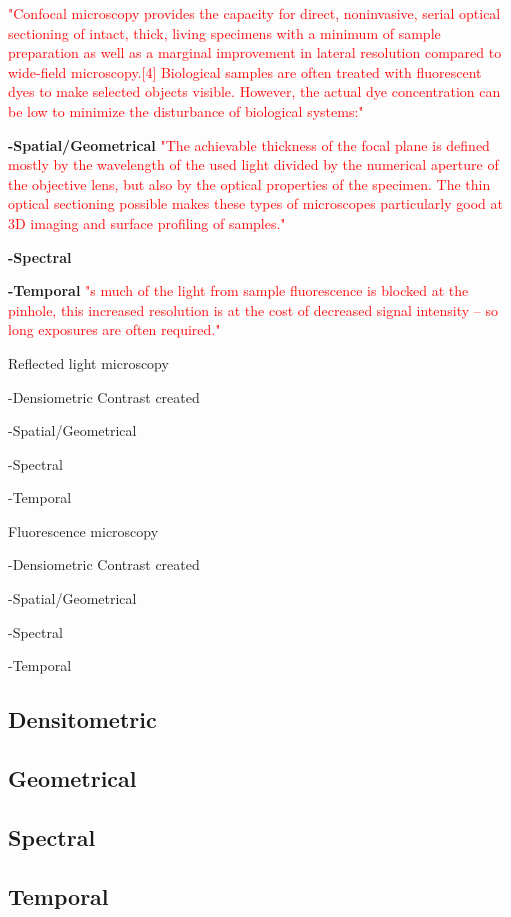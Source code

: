 	\textcolor{red}{"Confocal microscopy provides the capacity for direct, noninvasive, serial optical sectioning of intact, thick, living specimens with a minimum of sample preparation as well as a marginal improvement in lateral resolution compared to wide-field microscopy.[4] Biological samples are often treated with fluorescent dyes to make selected objects visible. However, the actual dye concentration can be low to minimize the disturbance of biological systems:"} 


	\textbf{-Spatial/Geometrical} 
	\textcolor{red}{"The achievable thickness of the focal plane is defined mostly by the wavelength of the used light divided by the numerical aperture of the objective lens, but also by the optical properties of the specimen. The thin optical sectioning possible makes these types of microscopes particularly good at 3D imaging and surface profiling of samples."} 


	\textbf{-Spectral}


	\textbf{-Temporal}
	\textcolor{red}{"s much of the light from sample fluorescence is blocked at the pinhole, this increased resolution is at the cost of decreased signal intensity – so long exposures are often required."} 



Reflected light microscopy

	-Densiometric
	Contrast created 


	-Spatial/Geometrical 

	-Spectral

	-Temporal



Fluorescence microscopy

	-Densiometric
	Contrast created 


	-Spatial/Geometrical 

	-Spectral

	-Temporal


\subsection*{Densitometric}



\subsection*{Geometrical}

\subsection*{Spectral}

\subsection*{Temporal}

